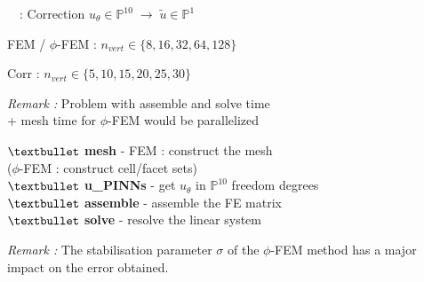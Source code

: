 \begin{frame}{\appendixname~\theappendixframenumber~: Correction}
	$u_\theta\in\mathbb{P}^{10} \; \rightarrow \; \tilde{u}\in\mathbb{P}^1$
	
	\begin{minipage}{0.5\linewidth}
		\centering
		
		\raggedright
		FEM / $\phi$-FEM : $n_{vert}\in\{8,16,32,64,128\}$
		
		Corr : $n_{vert}\in\{5,10,15,20,25,30\}$
	\end{minipage} \quad
	\begin{minipage}{0.46\linewidth}
		\centering
		
		\tiny\raggedright
		\textit{Remark :} Problem with assemble and solve time \\
		+ mesh time for $\phi$-FEM would be parallelized
		
		\small
		$\textbullet$ \textbf{mesh} - FEM : construct the mesh \\
		($\phi$-FEM : construct cell/facet sets) \\
		$\textbullet$ \textbf{u\_PINNs} - get $u_\theta$ in $\mathbb{P}^{10}$ freedom degrees \\
		$\textbullet$ \textbf{assemble} - assemble the FE matrix \\
		$\textbullet$ \textbf{solve} - resolve the linear system
	\end{minipage}
	
	\small
	\textit{Remark :} The stabilisation parameter $\sigma$ of the $\phi$-FEM method has a major impact on the error obtained.
\end{frame}
\addtocounter{appendixframenumber}{1}



